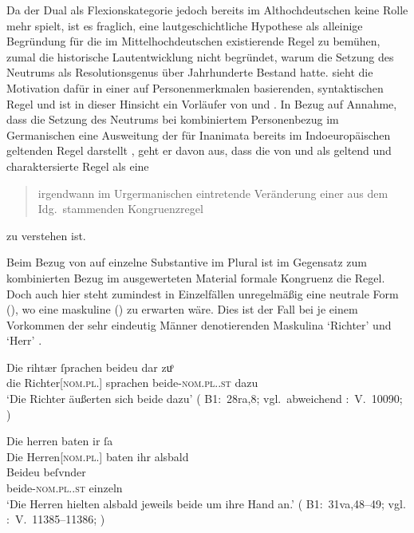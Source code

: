 Da der Dual als Flexionskategorie jedoch bereits im Althochdeutschen keine
Rolle mehr spielt, ist es fraglich, eine lautgeschichtliche Hypothese als
alleinige Begründung für die im Mittel\-hoch\-deutschen existierende Regel zu
bemühen, zumal die historische Lautentwicklung nicht begründet, warum die
Setzung des Neutrums als Resolutionsgenus über Jahrhunderte Bestand hatte.
\citet{askedal1973} sieht die Motivation dafür in einer auf Personenmerkmalen
basierenden, syntaktischen Regel und ist in dieser Hinsicht ein Vorläufer von
\citet{corbett1983} und \citet{wechslerzlatic2003}. In Bezug auf
 Annahme, dass die Setzung des Neutrums bei
kombiniertem Personenbezug im Germanischen eine Ausweitung der für Inanimata
bereits im Indoeuropäischen geltenden Regel darstellt
\autocite[vgl.~auch][156--157]{hock2008}, geht er davon aus, dass die von
\citet[28]{behaghel1928} und \citet[188]{dal2014} als 
geltend und  charaktersierte Regel als eine
\blockcquote[15]{askedal1973}{irgendwann im Urgermanischen
eintretende\textdel{} Veränderung einer aus dem Idg.\ stammenden
Kongruenzregel} zu verstehen ist.

Beim Bezug von  auf einzelne Substantive im Plural ist im
Gegensatz zum kombinierten Bezug im ausgewerteten Material formale Kongruenz
die Regel. Doch auch hier steht zumindest in Einzelfällen unregelmäßig eine
neutrale Form (), wo eine maskuline () zu erwarten
wäre. Dies ist der Fall bei je einem Vorkommen der sehr eindeutig Männer
denotierenden Maskulina  `Richter' und 
`Herr' .

\begin{exe}
\ex \label{ex:richtherriu3}
	\begin{xlist}
	\ex \gll Die rihtær ſprachen beideu {dar zuͦ} \\
			die Richter[\textsc{nom.pl.\MascM}] sprachen
				beide-\textsc{nom.pl.\NeutM.st} dazu \\
		\trans `Die Richter äußerten sich beide dazu'
			(%
				B1:~28ra,8; vgl.~abweichend
				\KC:~V.~10090;
				\cite[267]{schroeder1895}%
			)
		\label{ex:richtherriu3_1}

	\ex \gll Die herren baten ir ſa \\
			Die Herren[\textsc{nom.pl.\MascM}] baten ihr alsbald \\
	\sn \gll Beideu beſvnder \\
			beide-\textsc{nom.pl.\NeutM.st} einzeln \\
		\trans `Die Herren hielten alsbald jeweils beide um ihre Hand an.'
			(%
				B1:~31va,48--49; vgl.
				\KC:~V.~11385--11386;
				\cite[289]{schroeder1895}%
			)
		\label{ex:richtherriu3_2}
	\end{xlist}
\end{exe}

